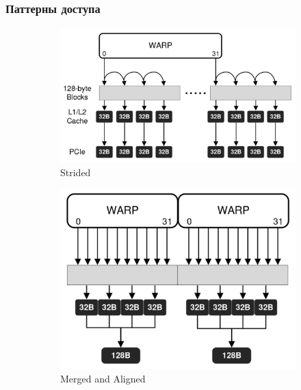\documentclass[xcolor=table,english]{beamer}
\begin{document}
\begin{frame}[fragile] \frametitle{Паттерны доступа}
    \begin{minipage}[m]{1.0\linewidth}
        \begin{figure}
            \centering
            \begin{subfigure}[b]{0.3\textwidth}
                \includegraphics[width=\textwidth]{figures/strided_access.png}
                \caption{Strided}
            \end{subfigure}
            \hfill
            \begin{subfigure}[b]{0.3\textwidth}
                \includegraphics[width=\textwidth]{figures/merged_aligned_access.png}
                \caption{Merged and Aligned}
            \end{subfigure}
            \hfill
            \begin{subfigure}[b]{0.3\textwidth}

\end{subfigure}
\end{figure}
\end{minipage}
\end{frame}
\end{document}
